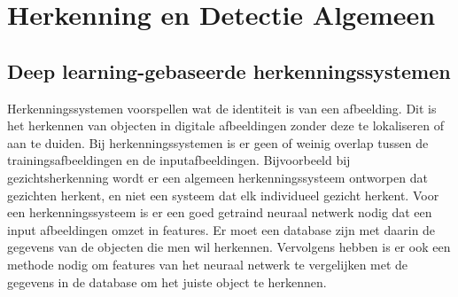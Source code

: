 \chapter{Herkenning en Detectie Algemeen}

\section{Deep learning-gebaseerde herkenningssystemen}
Herkenningssystemen voorspellen wat de identiteit is van een afbeelding. 
Dit is het herkennen van objecten in digitale afbeeldingen zonder deze te lokaliseren of aan te duiden. 
Bij herkenningssystemen is er geen of weinig overlap tussen de trainingsafbeeldingen en de inputafbeeldingen.
Bijvoorbeeld bij gezichtsherkenning wordt er een algemeen herkenningssysteem ontworpen dat gezichten herkent, en niet een systeem dat elk individueel gezicht herkent.
Voor een herkenningssysteem is er een goed getraind neuraal netwerk nodig dat een input afbeeldingen omzet in features. 
Er moet een database zijn met daarin de gegevens van de objecten die men wil herkennen. 
Vervolgens hebben is er ook een methode nodig om features van het neuraal netwerk te vergelijken met de gegevens in de database om het juiste object te herkennen.

